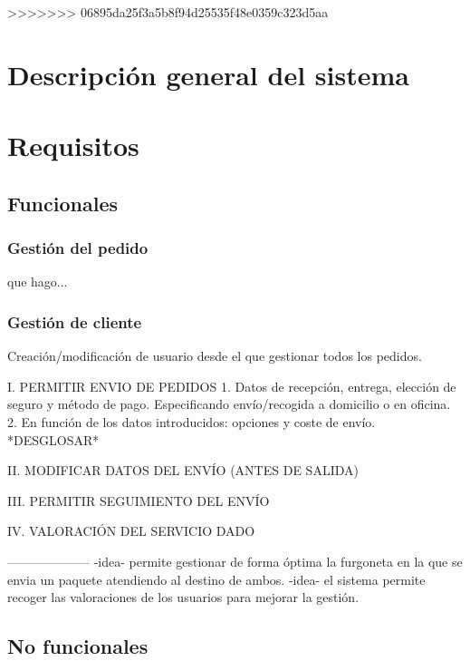 >>>>>>> 06895da25f3a5b8f94d25535f48e0359c323d5aa

\newpage

\section{Descripción general del sistema}

\newpage

\section{Requisitos}
\subsection{Funcionales}
\subsubsection{Gestión del pedido}
que hago...

\subsubsection{Gestión de cliente}
Creación/modificación de usuario desde el que gestionar todos los pedidos.

I. PERMITIR ENVIO DE PEDIDOS
1. Datos de recepción, entrega, elección de seguro y método de pago. Especificando envío/recogida a domicilio o en oficina.
2. En función de los datos introducidos: opciones y coste de envío.
*DESGLOSAR*

II. MODIFICAR DATOS DEL ENVÍO (ANTES DE SALIDA)

III. PERMITIR SEGUIMIENTO DEL ENVÍO

IV. VALORACIÓN DEL SERVICIO DADO






--------------------
-idea- permite gestionar de forma óptima la furgoneta en la que se envia un paquete atendiendo al destino de ambos.
-idea- el sistema permite recoger las valoraciones de los usuarios para mejorar la gestión.
\newpage
\subsection{No funcionales}

